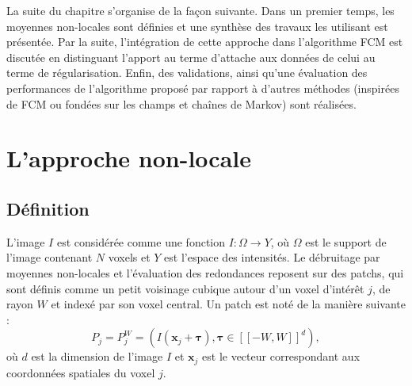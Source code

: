 La suite du chapitre s'organise de la façon suivante.
Dans un premier temps, les moyennes non-locales sont définies et une synthèse des travaux les utilisant est présentée.
Par la suite, l'intégration de cette approche dans l'algorithme FCM est discutée en distinguant l'apport au terme d'attache aux données de celui au terme de régularisation.
Enfin, des validations, ainsi qu'une évaluation des performances de l'algorithme proposé par rapport à d'autres méthodes (inspirées de FCM ou fondées sur les champs et chaînes de Markov) sont réalisées.

\section{L'approche non-locale}
\label{sec:nl:def}

\subsection{Définition}

L'image $I$ est considérée comme une fonction $I : \Omega \rightarrow Y$, où $\Omega$ est le support de l'image contenant $N$ voxels et $Y$ est l'espace des intensités.
Le débruitage par moyennes non-locales et l'évaluation des redondances reposent sur des patchs, qui sont définis comme un petit voisinage cubique autour d'un voxel d'intérêt $j$, de rayon $W$ et indexé par son voxel central.
Un patch est noté de la manière suivante : 
\begin{equation}
P_{j} = P^{W}_{j} = \left( I(\mathbf{x}_j+\mathbf{\tau}), \mathbf{\tau} \in [\![ -W, W ]\!]^{d} \right) \label{nlfcm:patch:def},
\end{equation}
où $d$ est la dimension de l'image $I$ et $\mathbf{x}_j$ est le vecteur correspondant aux coordonnées spatiales du voxel $j$.

